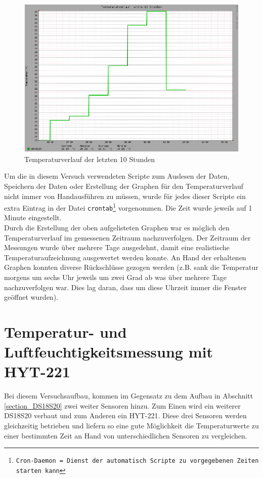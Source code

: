 \begin{figure}[!h] 
  \centering
     \includegraphics[scale=.28]{BilderAllgemein/TemperaturTag.png}
  \caption{Temperaturverlauf der letzten 10 Stunden}
  \label{Abb_Temperaturverlauf_10Stunden_DS18S20}
\end{figure}

Um die in diesem Versuch verwendeten Scripte zum Auslesen der Daten, Speichern der Daten oder Erstellung der Graphen für den Temperaturverlauf nicht immer von \glqq Hand\grqq ausführen zu müssen, wurde für jedes dieser Scripte ein extra Eintrag in der Datei \texttt{crontab\footnote{Cron-Daemon = Dienst der automatisch Scripte zu vorgegebenen Zeiten starten kann}} vorgenommen. Die Zeit wurde jeweils auf 1 Minute eingestellt.\\
Durch die Erstellung der oben aufgelisteten Graphen war es möglich den Temperaturverlauf im gemessenen Zeitraum nachzuverfolgen. Der Zeitraum der Messungen wurde über mehrere Tage ausgedehnt, damit eine realistische Temperaturaufzeichnung ausgewertet werden konnte. An Hand der erhaltenen Graphen konnten diverse Rückschlüsse gezogen werden (z.B. sank die Temperatur morgens um sechs Uhr jeweils um zwei Grad ab was über mehrere Tage nachzuverfolgen war. Dies lag daran, dass um diese Uhrzeit immer die Fenster geöffnet wurden).\\



\section{Temperatur- und Luftfeuchtigkeitsmessung mit HYT-221}
\label{section_HTY221}
Bei diesem Versuchsaufbau, kommen im Gegensatz zu dem Aufbau in Abschnitt \ref{section_DS18S20} zwei weiter Sensoren hinzu. Zum Einen wird ein weiterer DS18S20 verbaut und zum Anderen ein HYT-221. Diese drei Sensoren werden gleichzeitig betrieben und liefern so eine gute Möglichkeit die Temperaturwerte zu einer bestimmten Zeit an Hand von unterschiedlichen Sensoren zu vergleichen.
